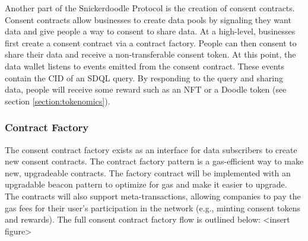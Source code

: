 Another part of the Snickerdoodle Protocol is the creation of consent contracts. Consent contracts allow businesses to create data pools by signaling they want data and give people a way to consent to share data. At a high-level, businesses first create a consent contract via a contract factory. People can then consent to share their data and receive a non-transferable consent token. At this point, the data wallet listens to events emitted from the consent contract. These events contain the CID of an SDQL query. By responding to the query and sharing data, people will receive some reward such as an NFT or a Doodle token (see section \ref{section:tokenomics}).





\subsubsection{Contract Factory}
The consent contract factory exists as an interface for data subscribers to create new consent contracts. The contract factory pattern is a gas-efficient way to make new, upgradeable contracts. The factory contract will be implemented with an upgradable beacon pattern to optimize for gas and make it easier to upgrade. The contracts will also support meta-transactions, allowing companies to pay the gas fees for their user's participation in the network (e.g., minting consent tokens and rewards). The full consent contract factory flow is outlined below: <insert figure>

